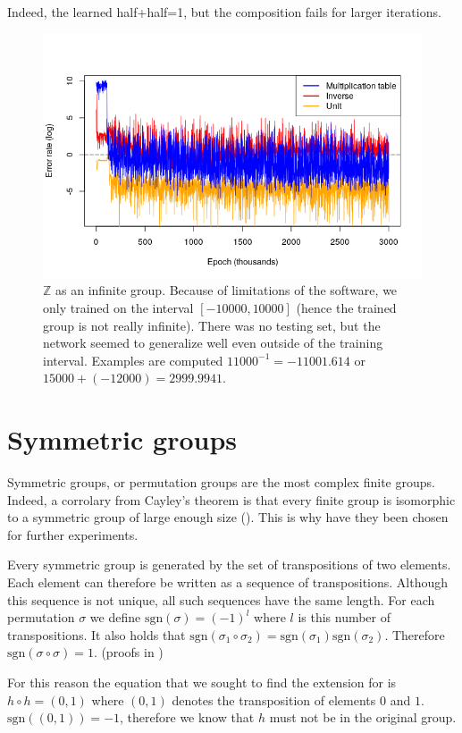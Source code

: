 Indeed, the learned half+half=1, but the composition fails for larger iterations.
\begin{figure}
\caption{$\mathbb{Z}$ as an infinite group. Because of limitations of the software, we only trained on the interval $[-10000,10000]$ (hence the trained group is not really infinite). There was no testing set, but the network seemed to generalize well even outside of the training interval. Examples are computed $11000^{-1}=-11001.614$ or $15000+(-12000)=2999.9941$.}
\centering
\label{graph:z_inf}
\includegraphics[width=\linewidth]{../img/z_inf.png}
\end{figure}

\section{Symmetric groups}
Symmetric groups, or permutation groups are the most complex finite groups. Indeed, a corrolary from Cayley's theorem  is that every finite group is isomorphic to a symmetric group of large enough size (\cite{cayley}). This is why have they been chosen for further experiments.

Every symmetric group is generated by the set of transpositions of two elements. Each element can therefore be written as a sequence of transpositions. Although this sequence is not unique, all such sequences have the same length. For each permutation $\sigma$ we define $\text{sgn}(\sigma)=(-1)^l$ where $l$ is this number of transpositions. It also holds that $\text{sgn}(\sigma_1\circ\sigma_2)=\text{sgn}(\sigma_1)\text{sgn}(\sigma_2)$. Therefore $\text{sgn}(\sigma\circ\sigma)=1$. (proofs in \cite{Lingebra})

For this reason the equation that we sought to find the extension for is $h\circ h=(0,1)$ where $(0,1)$ denotes the transposition of elements $0$ and $1$. $\text{sgn}((0,1))=-1$, therefore we know that $h$ must not be in the original group. 

